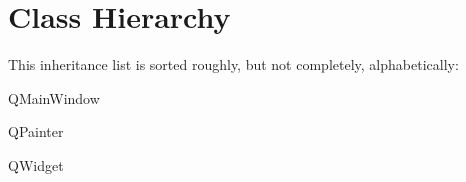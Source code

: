 \section{Class Hierarchy}
This inheritance list is sorted roughly, but not completely, alphabetically\+:\begin{DoxyCompactList}
\item Q\+Main\+Window\begin{DoxyCompactList}
\item {}
\end{DoxyCompactList}
\item Q\+Painter\begin{DoxyCompactList}
\item {}
\begin{DoxyCompactList}
\item {}
\item {}
\item {}
\item {}
\item {}
\item {}
\end{DoxyCompactList}
\end{DoxyCompactList}
\item Q\+Widget\begin{DoxyCompactList}
\item {}
\end{DoxyCompactList}
\end{DoxyCompactList}
